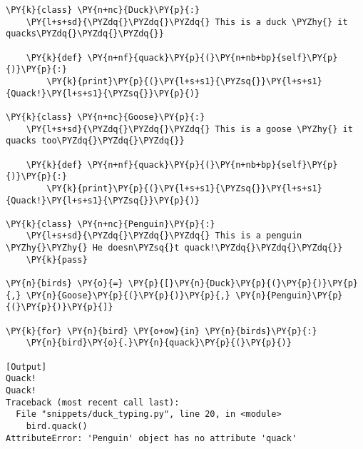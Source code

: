 \begin{Verbatim}[label=\makebox{\url{https://bitbucket.org/lbaldini/programming/src/tip/snippets/duck\_typing.py}},commandchars=\\\{\}]
\PY{k}{class} \PY{n+nc}{Duck}\PY{p}{:}
    \PY{l+s+sd}{\PYZdq{}\PYZdq{}\PYZdq{} This is a duck \PYZhy{} it quacks\PYZdq{}\PYZdq{}\PYZdq{}}
    
    \PY{k}{def} \PY{n+nf}{quack}\PY{p}{(}\PY{n+nb+bp}{self}\PY{p}{)}\PY{p}{:}
        \PY{k}{print}\PY{p}{(}\PY{l+s+s1}{\PYZsq{}}\PY{l+s+s1}{Quack!}\PY{l+s+s1}{\PYZsq{}}\PY{p}{)}
        
\PY{k}{class} \PY{n+nc}{Goose}\PY{p}{:}
    \PY{l+s+sd}{\PYZdq{}\PYZdq{}\PYZdq{} This is a goose \PYZhy{} it quacks too\PYZdq{}\PYZdq{}\PYZdq{}}
    
    \PY{k}{def} \PY{n+nf}{quack}\PY{p}{(}\PY{n+nb+bp}{self}\PY{p}{)}\PY{p}{:}
        \PY{k}{print}\PY{p}{(}\PY{l+s+s1}{\PYZsq{}}\PY{l+s+s1}{Quack!}\PY{l+s+s1}{\PYZsq{}}\PY{p}{)}

\PY{k}{class} \PY{n+nc}{Penguin}\PY{p}{:}
    \PY{l+s+sd}{\PYZdq{}\PYZdq{}\PYZdq{} This is a penguin \PYZhy{}\PYZhy{} He doesn\PYZsq{}t quack!\PYZdq{}\PYZdq{}\PYZdq{}}
    \PY{k}{pass} 

\PY{n}{birds} \PY{o}{=} \PY{p}{[}\PY{n}{Duck}\PY{p}{(}\PY{p}{)}\PY{p}{,} \PY{n}{Goose}\PY{p}{(}\PY{p}{)}\PY{p}{,} \PY{n}{Penguin}\PY{p}{(}\PY{p}{)}\PY{p}{]}

\PY{k}{for} \PY{n}{bird} \PY{o+ow}{in} \PY{n}{birds}\PY{p}{:}
    \PY{n}{bird}\PY{o}{.}\PY{n}{quack}\PY{p}{(}\PY{p}{)}

[Output]
Quack!
Quack!
Traceback (most recent call last):
  File "snippets/duck_typing.py", line 20, in <module>
    bird.quack()
AttributeError: 'Penguin' object has no attribute 'quack'
\end{Verbatim}